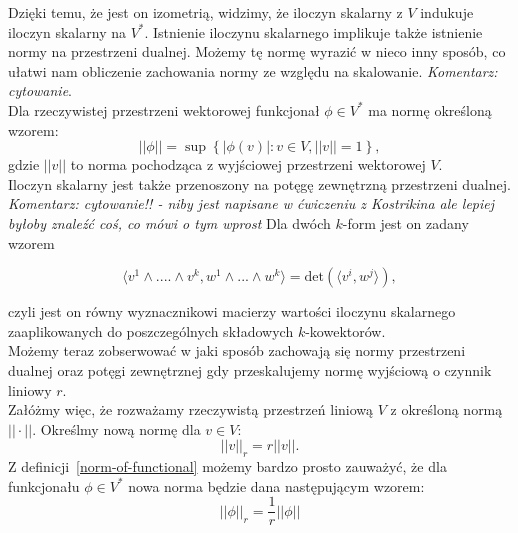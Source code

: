 \documentclass[licencjacka]{pracamgr}
\theoremstyle{definition}
\theoremstyle{definition}
\theoremstyle{plain}
\theoremstyle{plain}
\theoremstyle{plain}
\theoremstyle{plain}
\begin{document}
Dzięki temu, że jest on izometrią, widzimy, że iloczyn skalarny z $V$ indukuje
iloczyn skalarny na $V^\ast$.  Istnienie iloczynu skalarnego implikuje także
istnienie normy na przestrzeni dualnej. Możemy tę normę wyrazić w nieco inny
sposób, co ułatwi nam obliczenie zachowania normy ze względu na skalowanie.
\emph{Komentarz: cytowanie}. \\

Dla rzeczywistej przestrzeni wektorowej funkcjonał $\phi \in V^\ast$ ma
normę określoną wzorem:
\begin{equation}\label{norm-of-functional}
||\phi|| = \sup \left\{ |\phi(v)|: v \in V, ||v|| = 1 \right\},
\end{equation}
gdzie $||v||$ to norma pochodząca z wyjściowej przestrzeni wektorowej $V$.  \\


Iloczyn skalarny jest także przenoszony na potęgę zewnętrzną przestrzeni
dualnej. \emph{Komentarz: cytowanie!! - niby jest napisane w ćwiczeniu z
Kostrikina ale lepiej byłoby znaleźć coś, co mówi o tym wprost} Dla dwóch
$k$-form jest on zadany wzorem

\begin{equation} \langle v^1 \wedge ....\wedge v^k, w^1 \wedge ... \wedge w^k
\rangle = \text{det} \left( \langle v^i, w^j \rangle \right), 
\end{equation}

czyli jest on równy wyznacznikowi macierzy wartości iloczynu skalarnego
zaaplikowanych do poszczególnych składowych $k$-kowektorów.  \\

Możemy teraz zobserwować w jaki sposób zachowają się normy 
przestrzeni dualnej oraz potęgi zewnętrznej gdy przeskalujemy normę wyjściową
o czynnik liniowy $r$. \\

Załóżmy więc, że rozważamy rzeczywistą przestrzeń liniową $V$ z określoną
normą $|| \cdot ||$. Określmy nową normę dla $v \in V$:
\[
|| v ||_r = r || v ||.
\]
Z definicji~\ref{norm-of-functional} możemy bardzo prosto zauważyć, że
dla funkcjonału $\phi \in V^\ast$ nowa norma będzie dana następującym
wzorem:
\[
|| \phi ||_r = \frac{1}{r} ||\phi ||
\]
\end{document}
